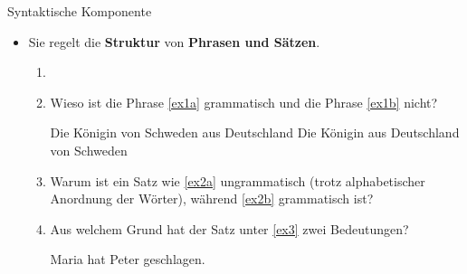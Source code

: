 \begin{frame}{Syntaktische Komponente}

\begin{itemize}
	\item Sie regelt die \textbf{Struktur} von \textbf{Phrasen und Sätzen}.

	\begin{enumerate}
		\item[]
		\item<2->[$\rightarrow$] Wieso ist die Phrase \ref{ex1a} grammatisch und die Phrase \ref{ex1b} nicht?
		
\eal
	\ex \label{ex1a} Die Königin von Schweden aus Deutschland 
	\ex \label{ex1b} Die Königin aus Deutschland von Schweden
	\zl
		\item<3->[$\rightarrow$] Warum ist ein Satz wie \ref{ex2a} ungrammatisch (trotz alphabetischer Anordnung der Wörter), während \ref{ex2b} grammatisch ist?

\eal
	\label{ex2a}
	\label{ex2b}
	\zl
	
		\item<4->[$\rightarrow$] Aus welchem Grund hat der Satz unter \ref{ex3} zwei Bedeutungen? 

\ea Maria hat Peter geschlagen.\label{ex3}
\z

	\end{enumerate}
			
\end{itemize}

\end{frame}


%
%
		
